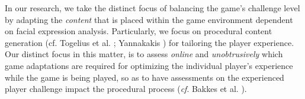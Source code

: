 \documentclass[letterpaper]{article}
\begin{document}
In our research, we take the distinct focus of balancing the game's challenge level by adapting the \emph{content} that is placed within the game environment dependent on facial expression analysis. Particularly, we focus on procedural content generation (cf. Togelius et al. \citeyear{togelius2011search}; Yannakakis \citeyear{Yannakakis2011a}) for tailoring the player experience. Our distinct focus in this matter, is to assess \emph{online} and \emph{unobtrusively} which game adaptations are required for optimizing the individual player's experience while the game is being played, so as to have assessments on the experienced player challenge impact the procedural process (\emph{cf}. Bakkes et al. \citeyear{Bakkes:ChallengeBalancing}).




\end{document}

